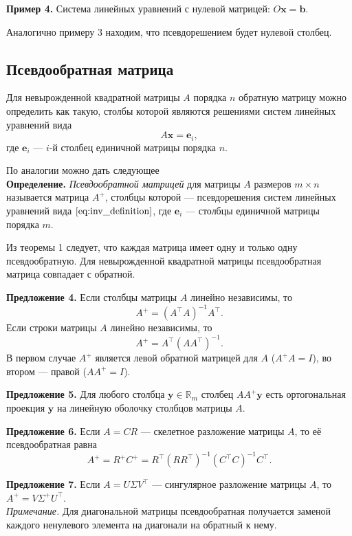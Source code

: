 \documentclass[11pt,a4paper]{article}
\begin{document}
    \textbf{Пример 4.} Система линейных уравнений с нулевой матрицей:
\(O \mathbf{x} = \mathbf{b}\).

Аналогично примеру 3 находим, что псевдорешением будет нулевой столбец.

    \hypertarget{ux43fux441ux435ux432ux434ux43eux43eux431ux440ux430ux442ux43dux430ux44f-ux43cux430ux442ux440ux438ux446ux430}{%
\subsection{Псевдообратная
матрица}\label{ux43fux441ux435ux432ux434ux43eux43eux431ux440ux430ux442ux43dux430ux44f-ux43cux430ux442ux440ux438ux446ux430}}

Для невырожденной квадратной матрицы \(A\) порядка \(n\) обратную
матрицу можно определить как такую, столбы которой являются решениями
систем линейных уравнений вида \[
  A\mathbf{x} = \mathbf{e}_i, \tag{2} \label{eq:inv_definition}
\] где \(\mathbf{e}_i\) --- \(i\)-й столбец единичной матрицы порядка
\(n\).

По аналогии можно дать следующее\\
\textbf{Определение.} \emph{Псевдообратной матрицей} для матрицы \(A\)
размеров \(m \times n\) называется матрица \(A^+\), столбцы которой ---
псевдорешения систем линейных уравнений вида
\(\eqref{eq:inv_definition}\), где \(\mathbf{e}_i\) --- столбцы
единичной матрицы порядка \(m\).

Из теоремы 1 следует, что каждая матрица имеет одну и только одну
псевдообратную. Для невырожденной квадратной матрицы псевдообратная
матрица совпадает с обратной.

\textbf{Предложение 4.} Если столбцы матрицы \(A\) линейно независимы,
то \[
  A^+ = (A^\top A)^{-1} A^\top.
\] Если строки матрицы \(A\) линейно независимы, то \[
  A^+ = A^\top (A A^\top)^{-1}.
\] В первом случае \(A^+\) является левой обратной матрицей для \(A\)
(\(A^+A=I\)), во втором --- правой (\(A A^+ = I\)).

\textbf{Предложение 5.} Для любого столбца
\(\mathbf{y} \in \mathbb{R}_m\) столбец \(A A^+ \mathbf{y}\) есть
ортогональная проекция \(\mathbf{y}\) на линейную оболочку столбцов
матрицы \(A\).

\textbf{Предложение 6.} Если \(A = CR\) --- скелетное разложение матрицы
\(A\), то её псевдообратная равна \[
  A^+ = R^+ C^+ = R^\top (R R^\top)^{-1} (C^\top C)^{-1} C^\top.
\]

\textbf{Предложение 7.} Если \(A = U \Sigma V^\top\) --- сингулярное
разложение матрицы \(A\), то \(A^+ = V \Sigma^+ U^\top\).\\
\emph{Примечание.} Для диагональной матрицы псевдообратная получается
заменой каждого ненулевого элемента на диагонали на обратный к нему.
\end{document}
